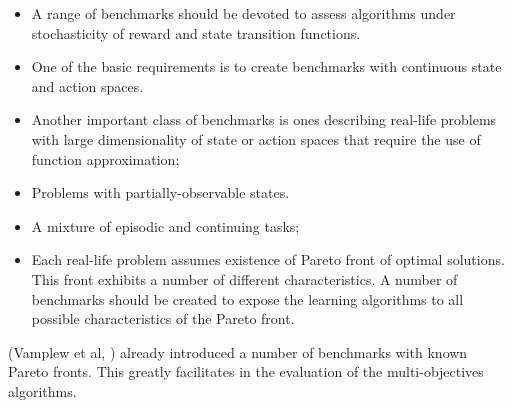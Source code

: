 {{\begin{itemize}
\item A range of benchmarks should be devoted to assess algorithms under stochasticity of reward and state transition functions.

\item One of the basic requirements is to create benchmarks with continuous state and action spaces.

\item Another important class of benchmarks is ones describing real-life problems with large dimensionality of state or action spaces that require the use of function approximation;

\item Problems with partially-observable states.

\item A mixture of episodic and continuing tasks;

\item Each real-life problem assumes existence of Pareto front of optimal solutions. This front exhibits a number of different characteristics. A number of benchmarks should be created to expose the learning algorithms to all possible characteristics of the Pareto front.

\end{itemize}

(Vamplew et al, \cite{VamplewDBID2011}) already introduced a number of benchmarks with known Pareto fronts. This greatly facilitates in the evaluation of the multi-objectives algorithms.

}}
